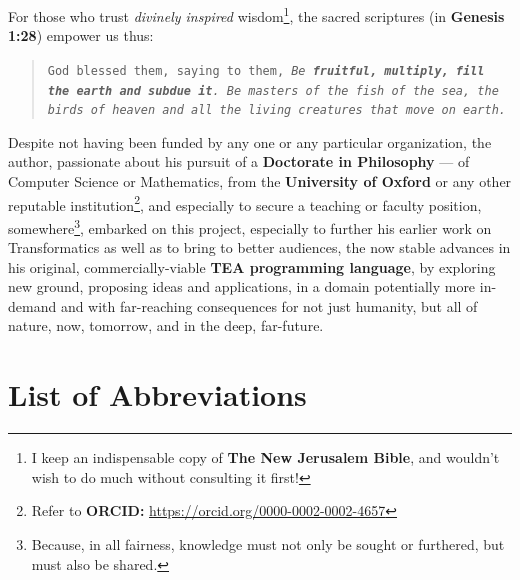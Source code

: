\documentclass[a4paper, 18pt]{book} %
\begin{document}
For those who trust \textit{divinely inspired} wisdom\footnote{I keep an indispensable copy of \textbf{The New Jerusalem Bible}, and wouldn't wish to do much without consulting it first!}, the sacred scriptures (in \textbf{Genesis 1:28}) empower us thus:

\begin{quotation}
\noindent \texttt{God blessed them, saying to them, \textit{Be \textbf{fruitful, multiply, fill the earth and subdue it}. Be masters of the fish of the sea, the birds of heaven and all the living creatures that move on earth.}}\\
\end{quotation}


Despite not having been funded by any one or any particular organization, the author, passionate about his pursuit of a \textbf{Doctorate in Philosophy} --- of Computer Science or Mathematics, from the \textbf{University of Oxford}\cite{lutalo_2025_sop}\cite{Lutalo2025_phd} or any other reputable institution\footnote{Refer to \textbf{ORCID:} \url{https://orcid.org/0000-0002-0002-4657}}, and especially to secure a teaching or faculty position, somewhere\footnote{Because, in all fairness, knowledge must not only be sought or furthered, but must also be shared.}, embarked on this project, especially to further his earlier work on Transformatics\cite{transformatics} as well as to bring to better audiences, the now stable advances in his original, commercially-viable \textbf{TEA programming language}\cite{cli_tttt}, by exploring new ground, proposing ideas and applications, in a domain potentially more in-demand and with far-reaching consequences for not just humanity, but all of nature, now, tomorrow, and in the deep, far-future. 



\chapter*{List of Abbreviations}
\end{document}
